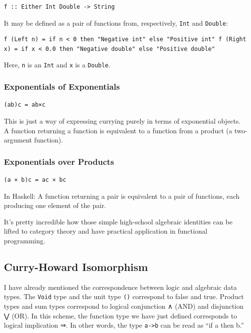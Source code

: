 \begin{verbatim}
f :: Either Int Double -> String
\end{verbatim}

It may be defined as a pair of functions from, respectively,
\texttt{Int} and \texttt{Double}:

\begin{verbatim}
f (Left n) = if n < 0 then "Negative int" else "Positive int" f (Right x) = if x < 0.0 then "Negative double" else "Positive double"
\end{verbatim}

Here, \texttt{n} is an \texttt{Int} and \texttt{x} is a \texttt{Double}.

\subsubsection{Exponentials of
Exponentials}\label{exponentials-of-exponentials}

\begin{verbatim}
(ab)c = ab×c
\end{verbatim}

This is just a way of expressing currying purely in terms of exponential
objects. A function returning a function is equivalent to a function
from a product (a two-argument function).

\subsubsection{Exponentials over
Products}\label{exponentials-over-products}

\begin{verbatim}
(a × b)c = ac × bc
\end{verbatim}

In Haskell: A function returning a pair is equivalent to a pair of
functions, each producing one element of the pair.

It's pretty incredible how those simple high-school algebraic identities
can be lifted to category theory and have practical application in
functional programming.

\subsection{Curry-Howard Isomorphism}\label{curry-howard-isomorphism}

I have already mentioned the correspondence between logic and algebraic
data types. The \texttt{Void} type and the unit type \texttt{()}
correspond to false and true. Product types and sum types correspond to
logical conjunction ∧ (AND) and disjunction ⋁ (OR). In this scheme, the
function type we have just defined corresponds to logical implication ⇒.
In other words, the type \texttt{a-\textgreater{}b} can be read as ``if
a then b.''

